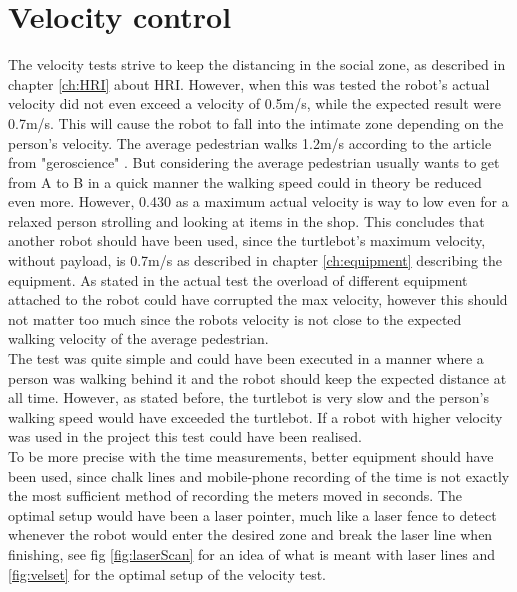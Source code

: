 \section{Velocity control}

The velocity tests strive to keep the distancing in the social zone, as described in chapter \ref{ch:HRI} about HRI. However, when this was tested the robot's actual velocity did not even exceed a velocity of 0.5m/s, while the expected result were 0.7m/s. This will cause the robot to fall into the intimate zone depending on the person's velocity. The average pedestrian walks 1.2m/s according to the article from "geroscience" \cite{callisaya2017cognitive}. But considering the average pedestrian usually wants to get from A to B in a quick manner the walking speed could in theory be reduced even more. However, 0.430 as a maximum actual velocity is way to low even for a relaxed person strolling and looking at items in the shop. This concludes that another robot should have been used, since the turtlebot's maximum velocity, without payload, is 0.7m/s as described in chapter \ref{ch:equipment} describing the equipment. As stated in the actual test the overload of different equipment attached to the robot could have corrupted the max velocity, however this should not matter too much since the robots velocity is not close to the expected walking velocity of the average pedestrian.\\
The test was quite simple and could have been executed in a manner where a person was walking behind it and the robot should keep the expected distance at all time. However, as stated before, the turtlebot is very slow and the person's walking speed would have exceeded the turtlebot. If a robot with higher velocity was used in the project this test could have been realised.\\
To be more precise with the time measurements, better equipment should have been used, since chalk lines and mobile-phone recording of the time is not exactly the most sufficient method of recording the meters moved in seconds. The optimal setup would have been a laser pointer, much like a laser fence to detect whenever the robot would enter the desired zone and break the laser line when finishing, see fig \ref{fig:laserScan} for an idea of what is meant with laser lines and \ref{fig:velset} for the optimal setup of the velocity test.

